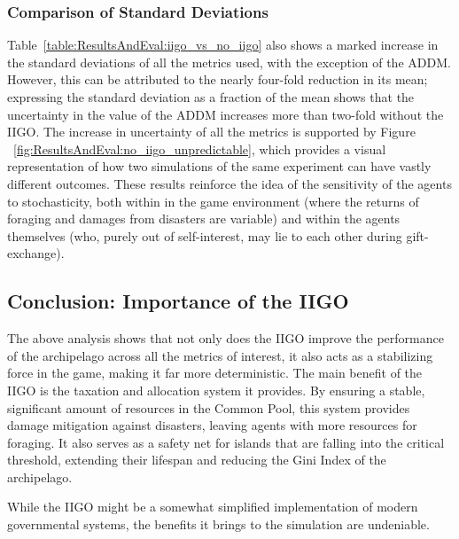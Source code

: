 \subsubsection{Comparison of Standard Deviations}
\label{subsec:ResultsAndEval:no-iigo:comparison_of_std_devs}
Table~\ref{table:ResultsAndEval:iigo_vs_no_iigo} also shows a marked increase in the standard deviations of all the metrics used, with the exception of the ADDM. However, this can be attributed to the nearly four-fold reduction in its mean; expressing the standard deviation as a fraction of the mean shows that the uncertainty in the value of the ADDM increases more than two-fold without the IIGO.
The increase in uncertainty of all the metrics is supported by Figure ~\ref{fig:ResultsAndEval:no_iigo_unpredictable}, which provides a visual representation of how two simulations of the same experiment can have vastly different outcomes. 
These results reinforce the idea of the sensitivity of the agents to stochasticity, both within in the game environment (where the returns of foraging and damages from disasters are variable) and within the agents themselves (who, purely out of self-interest, may lie to each other during gift-exchange).


\subsection{Conclusion: Importance of the IIGO}
\label{subsec:Simulations:no-iigo:conclusion}

The above analysis shows that not only does the IIGO improve the performance of the archipelago across all the metrics of interest, it also acts as a stabilizing force in the game, making it far more deterministic. 
The main benefit of the IIGO is the taxation and allocation system it provides. By ensuring a stable, significant amount of resources in the Common Pool, this system provides damage mitigation against disasters, leaving agents with more resources for foraging. 
It also serves as a safety net for islands that are falling into the critical threshold, extending their lifespan and reducing the Gini Index of the archipelago.

While the IIGO might be a somewhat simplified implementation of modern governmental systems, the benefits it brings to the simulation are undeniable.
